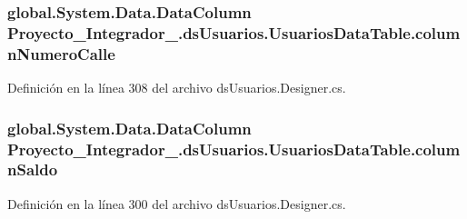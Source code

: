 \hypertarget{class_proyecto___integrador__3_1_1ds_usuarios_1_1_usuarios_data_table_a77c450d3e3d1fb155b43cc87e31803c2}{
\subsubsection[{column\-Numero\-Calle}]{\setlength{\rightskip}{0pt plus 5cm}global.\-System.\-Data.\-Data\-Column Proyecto\-\_\-\-Integrador\-\_.\-ds\-Usuarios.\-Usuarios\-Data\-Table.\-column\-Numero\-Calle\hspace{0.3cm}{\ttfamily [private]}}}\label{class_proyecto___integrador__3_1_1ds_usuarios_1_1_usuarios_data_table_a77c450d3e3d1fb155b43cc87e31803c2}


Definición en la línea 308 del archivo ds\-Usuarios.\-Designer.\-cs.

\hypertarget{class_proyecto___integrador__3_1_1ds_usuarios_1_1_usuarios_data_table_a2c6a39259573ff67502746b7c598768f}{
\subsubsection[{column\-Saldo}]{\setlength{\rightskip}{0pt plus 5cm}global.\-System.\-Data.\-Data\-Column Proyecto\-\_\-\-Integrador\-\_.\-ds\-Usuarios.\-Usuarios\-Data\-Table.\-column\-Saldo\hspace{0.3cm}{\ttfamily [private]}}}\label{class_proyecto___integrador__3_1_1ds_usuarios_1_1_usuarios_data_table_a2c6a39259573ff67502746b7c598768f}


Definición en la línea 300 del archivo ds\-Usuarios.\-Designer.\-cs.

